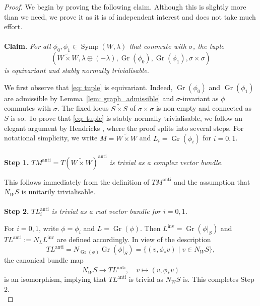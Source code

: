\documentclass[12pt]{article}
\theoremstyle{theorem}
\theoremstyle{definition}
\theoremstyle{remark}
\numberwithin{equation}{section}
\DeclareMathOperator{\anti}{anti}
\DeclareMathOperator{\inv}{inv}
\DeclareMathOperator{\Gr}{Gr}
\DeclareMathOperator{\Symp}{Symp}
\begin{document}
\begin{proof}
We begin by proving the following claim.
Although this is slightly more than we need, we prove it as it is of independent interest and does not take much effort.
\\\\
{\bf Claim.} \emph{For all $\phi_0,\phi_1\in \Symp(W,\lambda)$ that commute with $\sigma$, the tuple
\begin{equation}\label{eq: tuple}
	(\widetilde{W\times W},\lambda\oplus(-\lambda),\Gr(\phi_0),\Gr(\phi_1),\sigma\times \sigma)	
\end{equation}
is equivariant and stably normally trivialisable.}
	
We first observe that \eqref{eq: tuple} is equivariant.
Indeed, $\Gr(\phi_0)$ and $\Gr(\phi_1)$ are admissible by Lemma~\ref{lem: graph_admissible} and $\sigma$-invariant as $\phi$ commutes with $\sigma$.
The fixed locus $\widetilde{S\times S}$ of $\sigma\times \sigma$ is non-empty and connected as $S$ is so.
To prove that \eqref{eq: tuple} is stably normally trivialisable, we follow an elegant argument by Hendricks \cite[Section~7]{He12}, where the proof splits into several steps.
For notational simplicity, we write $M=\widetilde{W\times W}$ and $L_i=\Gr(\phi_i)$ for $i=0,1$.
\\\\
{\bf Step 1.} \emph{$TM^{\anti}=T(\widetilde{W\times W})^{\anti}$ is trivial as a complex vector bundle.}

This follows immediately from the definition of $TM^{\anti}$ and the assumption that $N_WS$ is unitarily trivialisable.\\\\
{\bf Step 2.} \emph{$TL_i^{\anti}$ is trivial as a real vector bundle for $i=0,1$.}

For $i=0,1$, write $\phi=\phi_i$ and $L=\Gr(\phi)$.
Then $L^{\inv}=\Gr(\phi|_S)$ and $TL^{\anti}:=N_LL^{\inv}$ are defined accordingly.
In view of the description
$$
TL^{\anti}=N_{\Gr(\phi)}\Gr(\phi|_S)=\{(v,\phi_*v) \mid v\in N_WS\},
$$
the canonical bundle map
$$
N_WS \to TL^{\anti}, \quad v\mapsto (v,\phi_*v)
$$
is an isomorphism, implying that $TL^{\anti}$ is trivial as $N_WS$ is.
This completes Step 2.\\


\end{proof}
\end{document}
